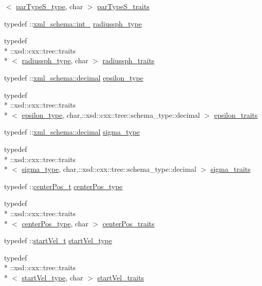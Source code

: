 \begin{DoxyCompactItemize}
$<$ \hyperlink{classsphere__t_a750fe86f76f8c344ccb25e7dc73c2655}{par\-Type\-S\-\_\-type}, char $>$ \hyperlink{classsphere__t_a29b1815b71844784d4fe00e4f5838d17}{par\-Type\-S\-\_\-traits}
\item 
typedef \-::\hyperlink{namespacexml__schema_acfa24ac68e1a188e7f44c36f7a158bf4}{xml\-\_\-schema\-::int\-\_\-} \hyperlink{classsphere__t_a81d467c00ec72dc7b9907b521744696d}{radiussph\-\_\-type}
\item 
typedef \\*
\-::xsd\-::cxx\-::tree\-::traits\\*
$<$ \hyperlink{classsphere__t_a81d467c00ec72dc7b9907b521744696d}{radiussph\-\_\-type}, char $>$ \hyperlink{classsphere__t_a75765172215aea8033266e27d5b0af1c}{radiussph\-\_\-traits}
\item 
typedef \-::\hyperlink{namespacexml__schema_a69bfaf24f63a8c18ebd8e21db6b343df}{xml\-\_\-schema\-::decimal} \hyperlink{classsphere__t_a9e61f3d5ab269b28a198f4b47519ac3f}{epsilon\-\_\-type}
\item 
typedef \\*
\-::xsd\-::cxx\-::tree\-::traits\\*
$<$ \hyperlink{classsphere__t_a9e61f3d5ab269b28a198f4b47519ac3f}{epsilon\-\_\-type}, char,\-::xsd\-::cxx\-::tree\-::schema\-\_\-type\-::decimal $>$ \hyperlink{classsphere__t_aaec867e294b5dc835b6b7b23bd6f03cb}{epsilon\-\_\-traits}
\item 
typedef \-::\hyperlink{namespacexml__schema_a69bfaf24f63a8c18ebd8e21db6b343df}{xml\-\_\-schema\-::decimal} \hyperlink{classsphere__t_a20806454a1e5e7f7fb50b22a49aef704}{sigma\-\_\-type}
\item 
typedef \\*
\-::xsd\-::cxx\-::tree\-::traits\\*
$<$ \hyperlink{classsphere__t_a20806454a1e5e7f7fb50b22a49aef704}{sigma\-\_\-type}, char,\-::xsd\-::cxx\-::tree\-::schema\-\_\-type\-::decimal $>$ \hyperlink{classsphere__t_a29db24a7516c6147929d3632d105d976}{sigma\-\_\-traits}
\item 
typedef \-::\hyperlink{classcenterPos__t}{center\-Pos\-\_\-t} \hyperlink{classsphere__t_a2786a8606da5d1dfbb50a237d6834daf}{center\-Pos\-\_\-type}
\item 
typedef \\*
\-::xsd\-::cxx\-::tree\-::traits\\*
$<$ \hyperlink{classsphere__t_a2786a8606da5d1dfbb50a237d6834daf}{center\-Pos\-\_\-type}, char $>$ \hyperlink{classsphere__t_a8519b138a55654520cb9314bbb472cfd}{center\-Pos\-\_\-traits}
\item 
typedef \-::\hyperlink{classstartVel__t}{start\-Vel\-\_\-t} \hyperlink{classsphere__t_a0235d82d12e4f91c5656e8ae64da4ca6}{start\-Vel\-\_\-type}
\item 
typedef \\*
\-::xsd\-::cxx\-::tree\-::traits\\*
$<$ \hyperlink{classsphere__t_a0235d82d12e4f91c5656e8ae64da4ca6}{start\-Vel\-\_\-type}, char $>$ \hyperlink{classsphere__t_a919a3fc37e88e6c692251a11409658c0}{start\-Vel\-\_\-traits}
\end{DoxyCompactItemize}
